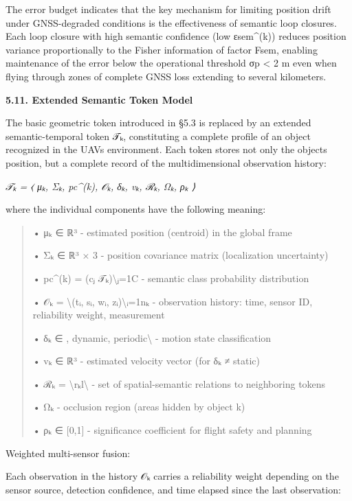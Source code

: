 \documentclass[
]{article}
\begin{document}
The error budget indicates that the key mechanism for limiting position
drift under GNSS-degraded conditions is the effectiveness of semantic
loop closures. Each loop closure with high semantic confidence (low
εsem\^{}(k)) reduces position variance proportionally to the Fisher
information of factor Fsem, enabling maintenance of the error below the
operational threshold σp \textless{} 2 m even when flying through zones
of complete GNSS loss extending to several kilometers.

\textbf{5.11. Extended Semantic Token Model}

The basic geometric token introduced in §5.3 is replaced by an extended
semantic-temporal token 𝒯ₖ, constituting a complete profile of an object
recognized in the UAV\textquotesingle s environment. Each token stores
not only the object\textquotesingle s position, but a complete record of
the multidimensional observation history:

\emph{𝒯ₖ = ⟨ μₖ, Σₖ, pc\^{}(k), 𝒪ₖ, δₖ, vₖ, ℛₖ, Ωₖ, ρₖ ⟩}

where the individual components have the following meaning:

\begin{quote}
• μₖ ∈ ℝ³ - estimated position (centroid) in the global frame

• Σₖ ∈ ℝ³ × 3 - position covariance matrix (localization uncertainty)

• pc\^{}(k) = (cⱼ \textbar{} 𝒯ₖ)\textbackslash ⱼ=1C - semantic class
probability distribution

• 𝒪ₖ = \textbackslash(tᵢ, sᵢ, wᵢ, zᵢ)\textbackslash ᵢ=1nₖ - observation
history: time, sensor ID, reliability weight, measurement

• δₖ ∈ , dynamic, periodic\textbackslash{} - motion state classification

• vₖ ∈ ℝ³ - estimated velocity vector (for δₖ ≠ static)

• ℛₖ = \textbackslash rₖl\textbackslash{} - set of spatial-semantic
relations to neighboring tokens

• Ωₖ - occlusion region (areas hidden by object k)

• ρₖ ∈ {[}0,1{]} - significance coefficient for flight safety and
planning
\end{quote}

Weighted multi-sensor fusion:

Each observation in the history 𝒪ₖ carries a reliability weight
depending on the sensor source, detection confidence, and time elapsed
since the last observation:
\end{document}
